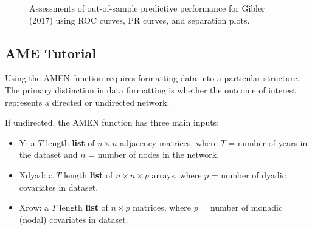 \begin{figure}
	\centering   
	\caption{Assessments of out-of-sample predictive performance for Gibler (2017) using ROC curves, PR curves, and separation plots.}
\end{figure}
\FloatBarrier
\clearpage

\subsection*{AME Tutorial}

Using the AMEN function requires formatting data into a particular structure. The primary distinction in data formatting is whether the outcome of interest represents a directed or undirected network. 

If undirected, the AMEN function has three main inputs:

\begin{itemize}[noitemsep,nolistsep]
    \item Y: a $T$ length \textbf{list} of $n\times n$ adjacency matrices, where $T$ = number of years in the dataset and $n$ = number of nodes in the network.
    \item Xdyad: a $T$ length \textbf{list} of $n\times n\times p$ arrays, where $p$ = number of dyadic covariates in dataset. 
    \item Xrow: a $T$ length \textbf{list} of $n\times p$ matrices, where $p$ = number of monadic (nodal) covariates in dataset. 
\end{itemize}


